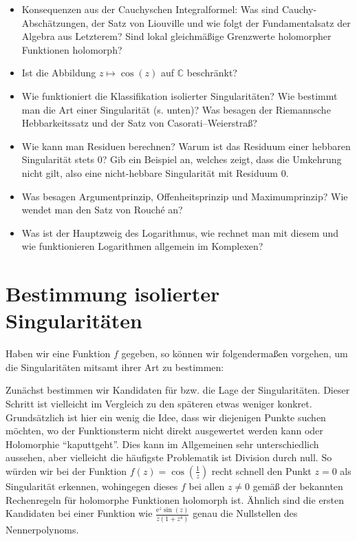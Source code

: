\documentclass{article}
\theoremstyle{plain}
\theoremstyle{definition}
\begin{document}
\begin{itemize}
	      Was besagen der Satz von Cauchy, die Cauchysche Integralformel und der Residuensatz, und was sind ihre Voraussetzungen?
	\item Konsequenzen aus der Cauchyschen Integralformel: Was sind Cauchy-Abschätzungen, der Satz von Liouville und wie folgt der Fundamentalsatz der Algebra aus Letzterem?
	      Sind lokal gleichmäßige Grenzwerte holomorpher Funktionen holomorph?
	\item Ist die Abbildung $z \mapsto \cos(z)$ auf $\mathbb{C}$ beschränkt?
	\item Wie funktioniert die Klassifikation isolierter Singularitäten?
	      Wie bestimmt man die Art einer Singularität (s. unten)?
	      Was besagen der Riemannsche Hebbarkeitssatz und der Satz von Casorati--Weierstraß?
	\item Wie kann man Residuen berechnen?
	      Warum ist das Residuum einer hebbaren Singularität stets $0$?
	      Gib ein Beispiel an, welches zeigt, dass die Umkehrung nicht gilt, also eine nicht-hebbare Singularität mit Residuum $0$.
	\item Was besagen Argumentprinzip, Offenheitsprinzip und Maximumprinzip?
	      Wie wendet man den Satz von Rouch\'{e} an?
	\item Was ist der Hauptzweig des Logarithmus, wie rechnet man mit diesem und wie funktionieren Logarithmen allgemein im Komplexen?
\end{itemize}

\section{Bestimmung isolierter Singularitäten}

Haben wir eine Funktion $f$ gegeben, so können wir folgendermaßen vorgehen, um die Singularitäten mitsamt ihrer Art zu bestimmen:

Zunächst bestimmen wir Kandidaten für bzw. die Lage der Singularitäten.
Dieser Schritt ist vielleicht im Vergleich zu den späteren etwas weniger konkret.
Grundsätzlich ist hier ein wenig die Idee, dass wir diejenigen Punkte suchen möchten, wo der Funktionsterm nicht direkt ausgewertet werden kann oder Holomorphie \enquote{kaputtgeht}.
Dies kann im Allgemeinen sehr unterschiedlich aussehen, aber vielleicht die häufigste Problematik ist Division durch null.
So würden wir bei der Funktion $f(z) = \cos(\tfrac{1}{z})$ recht schnell den Punkt $z = 0$ als Singularität erkennen, wohingegen dieses $f$ bei allen $z \neq 0$ gemäß der bekannten Rechenregeln für holomorphe Funktionen holomorph ist.
Ähnlich sind die ersten Kandidaten bei einer Funktion wie $\frac{\mathrm{e}^{z} \sin(z)}{z (1 + z^4)}$ genau die Nullstellen des Nennerpolynoms.
\end{document}
